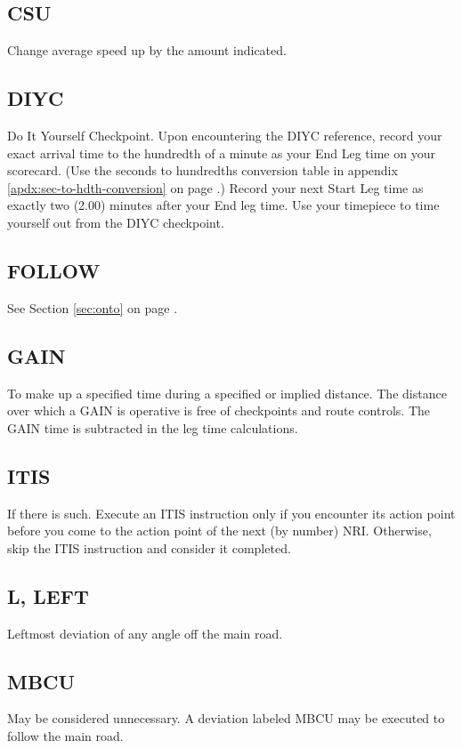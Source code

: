 \subsection{CSU}
Change average speed up by the amount indicated.

\subsection{DIYC}
Do It Yourself Checkpoint.  Upon encountering the DIYC reference, record your exact arrival time to the hundredth of a minute as your End Leg time on your scorecard.  (Use the seconds to hundredths conversion table in appendix \ref{apdx:sec-to-hdth-conversion} on page \pageref{apdx:sec-to-hdth-conversion}.)  Record your next Start Leg time as exactly two (2.00) minutes after your End leg time.  Use your timepiece to time yourself out from the DIYC checkpoint.

\subsection{FOLLOW}
See Section \ref{sec:onto} on page \pageref{sec:onto}.

\subsection{GAIN}
To make up a specified time during a specified or implied distance.  The distance over which a GAIN is operative is free of checkpoints and route controls.  The GAIN time is subtracted in the leg time calculations.

\subsection{ITIS}
If there is such.  Execute an ITIS instruction only if you encounter its action point before you come to the action point of the next (by number) NRI.  Otherwise, skip the ITIS instruction and consider it completed.

\subsection{L, LEFT}
Leftmost deviation of any angle off the main road.

\subsection{MBCU}
May be considered unnecessary.  A deviation labeled MBCU may be executed to follow the main road.

